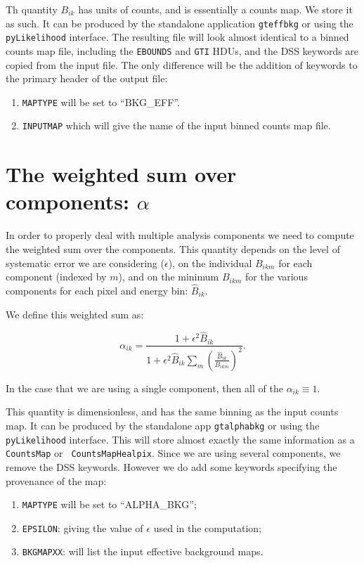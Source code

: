 \documentclass[preprint]{aastex}
\begin{document}
Th quantity $B_{ik}$ has units of counts, and is essentially a counts
map.  We store it as such.  It can be produced by the standalone
application {\tt gteffbkg} or using the {\tt pyLikelihood} interface.
The resulting file will look almost identical to a binned counts map
file, including the {\tt EBOUNDS} and {\tt GTI} HDUs, and the DSS
keywords are copied from the input file.  The only difference will be
the addition of keywords to the primary header of the output file:

\begin{enumerate}
\item{{\tt MAPTYPE} will be set to ``BKG\_EFF''.}
\item{{\tt INPUTMAP} which will give the name of the input binned counts map
file.}
\end{enumerate}

\section{The weighted sum over components: $\alpha$}

In order to properly deal with multiple analysis components we need to
compute the weighted sum over the components.  This quantity depends on
the level of systematic error we are considering ($\epsilon$), on the
individual $B_{ikm}$ for each component (indexed by $m$), and on the
minimum $B_{ikm}$ for the various components for each pixel and energy
bin: $\hat{B}_{ik}$.

We define this weighted sum as:

\begin{equation}
\alpha_{ik} = \frac{1 + \epsilon^2 \hat{B}_{ik}}{1 + \epsilon^2 \hat{B}_{ik} \sum_{m} (\frac{\hat{B}_{ik}}{B_{ikm}})^2 }.
\end{equation}

\noindent In the case that we are using a single component, then all
of the $\alpha_{ik} \equiv 1$.

This quantity is dimensionless, and has the same binning as the input
counts map.  It can be produced by the standalone app {\tt gtalphabkg}
or using the {\tt pyLikelihood} interface.  This will store almost
exactly the same information as a {\tt CountsMap} or {\tt
  CountsMapHealpix}. Since we are using several components, we remove 
the DSS keywords.  However we do add some keywords specifying the
provenance of the map:

\begin{enumerate}
\item{{\tt MAPTYPE} will be set to ``ALPHA\_BKG'';}
\item{{\tt EPSILON}: giving the value of $\epsilon$ used in the computation;}
\item{{\tt BKGMAPXX}: will list the input effective background maps.}    
\end{enumerate}
\end{document}
